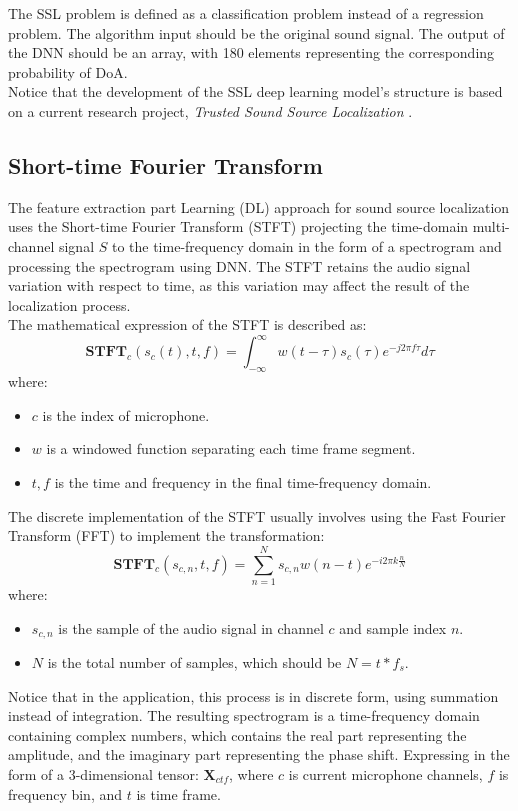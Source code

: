 
The SSL problem is defined as a classification problem instead of a regression problem. The algorithm input should be the original sound signal. The output of the DNN should be an array, with 180 elements representing the corresponding probability of DoA.\\
Notice that the development of the SSL deep learning model's structure is based on a current research project, \textit{Trusted Sound Source Localization} \cite{devin_sound_2024}.

\subsection*{Short-time Fourier Transform}
The feature extraction part Learning (DL) approach for sound source localization uses the Short-time Fourier Transform (STFT) projecting the time-domain multi-channel signal \(S\) to the time-frequency domain in the form of a spectrogram and processing the spectrogram using DNN. The STFT retains the audio signal variation with respect to time, as this variation may affect the result of the localization process. \\
The mathematical expression of the STFT is described as:
\[
    \textbf{STFT}_c(s_c(t), t,f) = \int_{-\infty}^{\infty} w(t-\tau) s_c(\tau) e^{-j2\pi f\tau}d\tau 
\]
where:
\begin{itemize}
    \item \(c\) is the index of microphone.
    \item \(w\) is a windowed function separating each time frame segment.
    \item \(t, f\) is the time and frequency in the final time-frequency domain. 
\end{itemize}
The discrete implementation of the STFT usually involves using the Fast Fourier Transform (FFT) to implement the transformation:
\[
    \textbf{STFT}_c(s_{c,n}, t, f) = \sum_{n = 1}^{N} s_{c,n} w(n-t) e^{-i2\pi k \frac{n}{N}}
\]
where:
\begin{itemize}
    \item \(s_{c,n}\) is the sample of the audio signal in channel \(c\) and sample index \(n\).
    \item \(N\) is the total number of samples, which should be \(N = t * f_s\).
\end{itemize}
Notice that in the application, this process is in discrete form, using summation instead of integration.
The resulting spectrogram is a time-frequency domain containing complex numbers, which contains the real part representing the amplitude, and the imaginary part representing the phase shift. Expressing in the form of a 3-dimensional tensor: \(\mathbf{X}_{ctf}\), where \(c\) is current microphone channels, \(f\) is frequency bin, and \(t\) is time frame.

